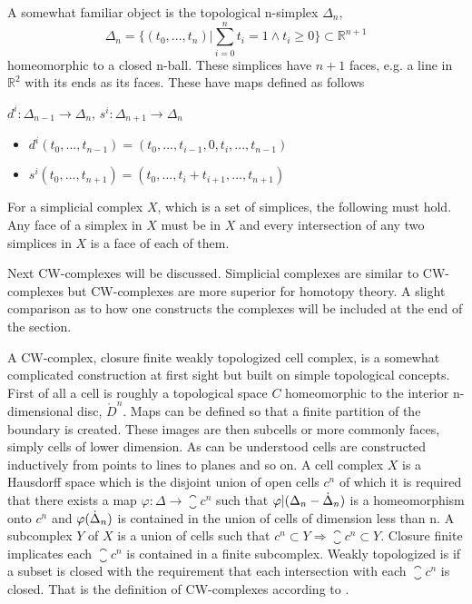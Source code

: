 \documentclass[../../main.tex]{subfiles}
\begin{document}
    A somewhat familiar object is the topological n-simplex $\Delta_n$,
    \begin{equation}
        \Delta_n = \{(t_0, . . . , t_n)  |\sum_{i=0}^{n}t_i=1 \wedge t_i \geq 0\} \subset \mathbb{R}^{n+1}
    \end{equation}
    homeomorphic to a closed n-ball. These simplices have $n+1$ faces, e.g. a line in $\mathbb{R}^2$ with its ends as its faces. These have maps defined as follows
    
    \begin{definition}
        $d^i:\Delta_{n-1}\to \Delta_n$, $s^i:\Delta_{n+1}\to \Delta_n$
        \begin{itemize}
           \item $d^i(t_0,...,t_{n-1})=(t_0,...,t_{i-1},0,t_i,...,t_{n-1})$
           \item $s^i(t_0,...,t_{n+1})=(t_0,...,t_i+t_{i+1},...,t_{n+1})$
        \end{itemize}
    \end{definition}
    
    For a simplicial complex $X$, which is a set of simplices, the following must hold. Any face of a simplex in $X$ must be in $X$ and every intersection of any two simplices in $X$ is a face of each of them.
    
    Next CW-complexes will be discussed. Simplicial complexes are similar to CW-complexes but CW-complexes are more superior for homotopy theory. A slight comparison as to how one constructs the complexes will be included at the end of the section. 
    
    A CW-complex, closure finite weakly topologized cell complex, is a somewhat complicated construction at first sight but built on simple topological concepts. First of all a cell is roughly a topological space $C$ homeomorphic to the interior n-dimensional disc, $\mathring{D}^n$. Maps can be defined so that a finite partition of the boundary is created. These images are then subcells or more commonly faces, simply cells of lower dimension. As can be understood cells are constructed inductively from points to lines to planes and so on. A cell complex $X$ is a Hausdorff space which is the disjoint union of open cells $c^n$ of which it is required that there exists a map $\varphi:\Delta\to\closure{c}^n$ such that $\varphi|(\Delta_n - \dot{\Delta}_n )$ is a homeomorphism onto $c^n$ and $\varphi(\dot{\Delta}_n)$ is contained in the union of cells of dimension less than n. A subcomplex $Y$ of $X$ is a union of cells such that $c^n\subset Y \Rightarrow \closure{c}^n\subset Y$. Closure finite implicates each $\closure{c}^n$ is contained in a finite subcomplex. Weakly topologized is if a subset is closed with the requirement that each intersection with each $\closure{c}^n$ is closed. That is the definition of CW-complexes according to \cite{simp-maye}.
    
\end{document}
